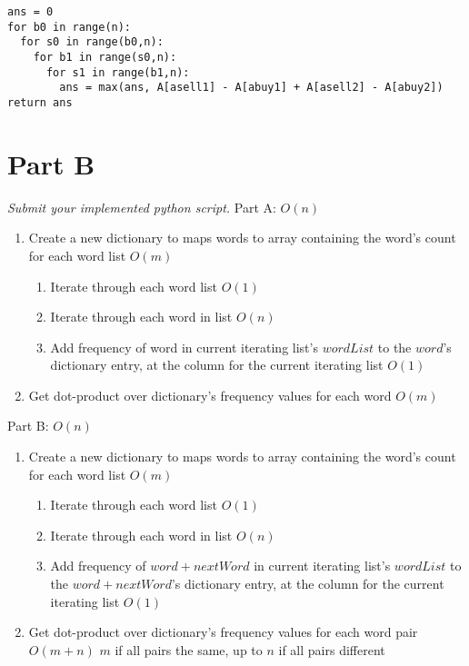 \documentclass[12pt,twoside]{article}
\begin{document}
\begin{problems}
\begin{problemparts}
\begin{verbatim}
ans = 0
for b0 in range(n):
  for s0 in range(b0,n):
    for b1 in range(s0,n):
      for s1 in range(b1,n):
        ans = max(ans, A[asell1] - A[abuy1] + A[asell2] - A[abuy2])
return ans
\end{verbatim}

\problempart
\end{problemparts}

\section*{Part B}
\problem  %
\begin{problemparts}
\emph{Submit your implemented python script.}
\problempart
\problempart
\problempart
\problempart
Part A: $O(n)$
\begin{enumerate}
\item Create a new dictionary to maps words to array containing the word's count for each word list $O(m)$
  \begin{enumerate}
  \item Iterate through each word list $O(1)$

  \item Iterate through each word in list $O(n)$

  \item Add frequency of word in current iterating list's $wordList$ to the $word$'s dictionary entry, at the column for the current iterating list $O(1)$
  \end{enumerate}
  \item Get dot-product over dictionary's frequency values for each word $O(m)$
\end{enumerate}

Part B: $O(n)$
\begin{enumerate}
\item Create a new dictionary to maps words to array containing the word's count for each word list $O(m)$
  \begin{enumerate}
  \item Iterate through each word list $O(1)$

  \item Iterate through each word in list $O(n)$

  \item Add frequency of $word + nextWord$ in current iterating list's $wordList$ to the $word + nextWord$'s dictionary entry, at the column for the current iterating list $O(1)$
  \end{enumerate}
  \item Get dot-product over dictionary's frequency values for each word pair $O(m + n)$ $m$ if all pairs the same, up to $n$ if all pairs different
\end{enumerate}


\end{problemparts}
\end{problems}
\end{document}
